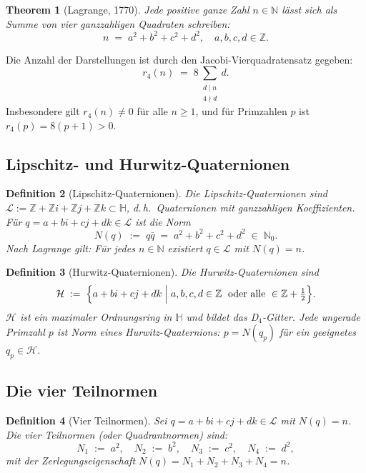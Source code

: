 \documentclass[12pt,a4paper]{article}
\newtheorem{definition}{Definition}[section]
\newtheorem{theorem}[definition]{Theorem}
\newcommand{\N}{\mathbb{N}}
\newcommand{\Z}{\mathbb{Z}}
\newcommand{\HH}{\mathbb{H}}
\begin{document}
\begin{theorem}[Lagrange, 1770]
\label{thm:lagrange}
Jede positive ganze Zahl $n \in \N$ lässt sich als Summe von vier ganzzahligen
Quadraten schreiben:
\[
  n \;=\; a^2 + b^2 + c^2 + d^2, \quad a,b,c,d \in \Z.
\]
\end{theorem}

Die Anzahl der Darstellungen ist durch den Jacobi-Vierquadratensatz gegeben:
\[
  r_4(n) \;=\; 8 \sum_{\substack{d \mid n \\ 4 \nmid d}} d.
\]
Insbesondere gilt $r_4(n) \neq 0$ für alle $n \geq 1$, und für Primzahlen $p$
ist $r_4(p) = 8(p+1) > 0$.

\subsection{Lipschitz- und Hurwitz-Quaternionen}

\begin{definition}[Lipschitz-Quaternionen]
Die \emph{Lipschitz-Quaternionen} sind $\mathcal{L} := \Z + \Z i + \Z j + \Z k \subset \HH$,
d.\,h.\ Quaternionen mit ganzzahligen Koeffizienten.
Für $q = a + bi + cj + dk \in \mathcal{L}$ ist die \emph{Norm}
\[
  N(q) \;:=\; q\bar{q} \;=\; a^2 + b^2 + c^2 + d^2 \;\in\; \N_0.
\]
Nach Lagrange gilt: Für jedes $n \in \N$ existiert $q \in \mathcal{L}$ mit $N(q) = n$.
\end{definition}

\begin{definition}[Hurwitz-Quaternionen]
Die \emph{Hurwitz-Quaternionen} sind
\[
  \mathcal{H} \;:=\; \Bigl\{ a + bi + cj + dk \;\Big|\;
    a,b,c,d \in \Z \;\text{ oder alle } \in \Z + \tfrac{1}{2} \Bigr\}.
\]
$\mathcal{H}$ ist ein maximaler Ordnungsring in $\HH$ und bildet das D${}_4$-Gitter.
Jede ungerade Primzahl $p$ ist Norm eines Hurwitz-Quaternions: $p = N(q_p)$ für
ein geeignetes $q_p \in \mathcal{H}$.
\end{definition}

\subsection{Die vier Teilnormen}

\begin{definition}[Vier Teilnormen]
\label{def:teilnormen}
Sei $q = a + bi + cj + dk \in \mathcal{L}$ mit $N(q) = n$. Die \emph{vier Teilnormen}
(oder Quadrantnormen) sind:
\[
  N_1 \;:=\; a^2, \quad
  N_2 \;:=\; b^2, \quad
  N_3 \;:=\; c^2, \quad
  N_4 \;:=\; d^2,
\]
mit der Zerlegungseigenschaft $N(q) = N_1 + N_2 + N_3 + N_4 = n$.
\end{definition}
\end{document}
